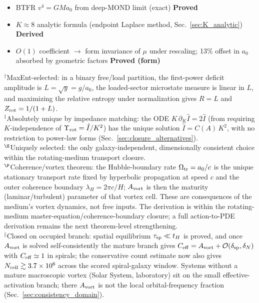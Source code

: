 \documentclass[11pt]{article}
\begin{document}
\begin{itemize}
  with unique solution (Bekenstein--Milgrom); the source-side kernel
  is the phantom density
  $\rho_{\rm ph}=-\frac{a_0}{4\pi G}
  \frac{(\nabla g)\cdot\hat{\mathbf{g}}}{g+a_0}$
  \hfill\textbf{Proved (AQUAL theorem)}
\item[$\to$] BTFR $v^4=GMa_0$ from deep-MOND limit (exact)
  \hfill\textbf{Proved}
\item[$\to$] $K\approx 8$ analytic formula
  (endpoint Laplace method, Sec.~\ref{sec:K_analytic})
  \hfill\textbf{Derived}
\item[$\to$] $O(1)$ coefficient $\to$ form invariance
  of $\mu$ under rescaling; 13\% offset in $a_0$
  absorbed by geometric factors
  \hfill\textbf{Proved (form)}
\end{itemize}
\noindent ${}^{\dagger}$MaxEnt-selected: in a binary free/load partition,
the first-power deficit amplitude is $L=\sqrt{y}=g/a_0$, the loaded-sector
microstate measure is linear in $L$, and maximizing the relative entropy
under normalization gives $R=L$ and $Z_{\rm rot}=1/(1+L)$.\\
${}^{\ddagger}$Absolutely unique by impedance matching:
the ODE $K\,\partial_K\hat I=2\hat I$ (from requiring
$K$-independence of $\Upsilon_{\rm rot}=\hat I/K^2$) has the
unique solution $\hat I=C(A)\,K^2$, with no restriction to
power-law forms (Sec.~\ref{sec:closure_alternatives}).\\
${}^{\S}$Uniquely selected: the only
galaxy-independent, dimensionally consistent choice
within the rotating-medium transport closure.\\
${}^{\P}$Coherence/vortex theorem: the Hubble-boundary rate
$\Omega_{\rm tr}=a_0/c$ is the unique stationary transport rate fixed by
hyperbolic propagation at speed $c$ and the outer coherence boundary
$\lambda_H=2\pi c/H$; $A_{\rm vort}$ is then the maturity
(laminar/turbulent) parameter of that vortex cell.
These are consequences of the medium's vortex dynamics, not
free inputs. The derivation is within the rotating-medium
master-equation/coherence-boundary closure; a full action-to-PDE
derivation remains the next theorem-level strengthening.\\
${}^{\parallel}$Closed on occupied branch: spatial equilibrium
$\tau_{\rm sp}\ll t_H$ is proved, and once $A_{\rm vort}$ is solved
self-consistently the mature branch gives
$C_{\rm eff}=A_{\rm vort}+\mathcal{O}(\delta_{\rm sp},\delta_N)$
with $C_{\rm eff}\simeq1$ in spirals; the conservative count estimate
now also gives $N_{\rm cell}\gtrsim3.7\times10^6$ across the scored
spiral-galaxy window.  Systems without a mature macroscopic vortex
(Solar System, laboratory) sit on the small effective-activation branch;
there $A_{\rm vort}$ is not the local orbital-frequency fraction
(Sec.~\ref{sec:consistency_domain}).
\end{document}
